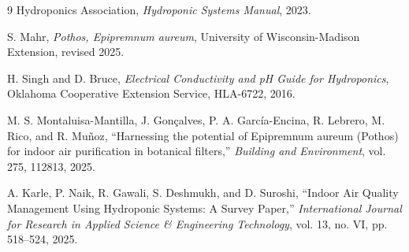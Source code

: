 \documentclass[14pt,a4paper]{report}
\begin{document}
\begin{thebibliography}{9}
Hydroponics Association, \textit{Hydroponic Systems Manual}, 2023.

S. Mahr, \textit{Pothos, Epipremnum aureum}, University of Wisconsin-Madison Extension, revised 2025.

H. Singh and D. Bruce, \textit{Electrical Conductivity and pH Guide for Hydroponics}, Oklahoma Cooperative Extension Service, HLA-6722, 2016.

M. S. Montaluisa-Mantilla, J. Gonçalves, P. A. García-Encina, R. Lebrero, M. Rico, and R. Muñoz, ``Harnessing the potential of Epipremnum aureum (Pothos) for indoor air purification in botanical filters,'' \textit{Building and Environment}, vol. 275, 112813, 2025.

A. Karle, P. Naik, R. Gawali, S. Deshmukh, and D. Suroshi, ``Indoor Air Quality Management Using Hydroponic Systems: A Survey Paper,'' \textit{International Journal for Research in Applied Science \& Engineering Technology}, vol. 13, no. VI, pp. 518--524, 2025.
\end{thebibliography}
\end{document}
